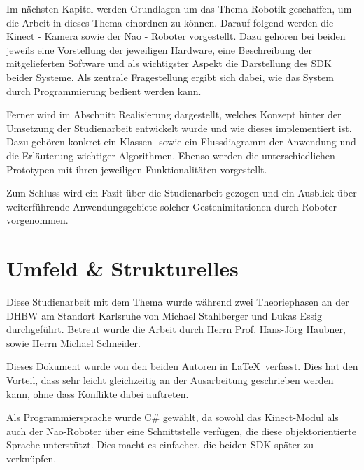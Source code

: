 Im nächsten Kapitel werden Grundlagen um das Thema Robotik geschaffen, um die Arbeit in dieses Thema einordnen zu können. Darauf folgend werden die Kinect - Kamera sowie der Nao - Roboter vorgestellt. Dazu gehören bei beiden jeweils eine Vorstellung der jeweiligen Hardware, eine Beschreibung der mitgelieferten Software und als wichtigster Aspekt die Darstellung des \ac{SDK} beider Systeme. Als zentrale Fragestellung ergibt sich dabei, wie das System durch Programmierung bedient werden kann.

Ferner wird im Abschnitt Realisierung dargestellt, welches Konzept hinter der Umsetzung der Studienarbeit entwickelt wurde und wie dieses implementiert ist. Dazu gehören konkret ein Klassen- sowie ein Flussdiagramm der Anwendung und die Erläuterung wichtiger Algorithmen. Ebenso werden die unterschiedlichen Prototypen mit ihren jeweiligen Funktionalitäten vorgestellt. 

Zum Schluss wird ein Fazit über die Studienarbeit gezogen und ein Ausblick über weiterführende Anwendungsgebiete solcher Gestenimitationen durch Roboter vorgenommen.

\section{Umfeld \& Strukturelles}
Diese Studienarbeit mit dem Thema \textit{\Titel} wurde während zwei Theoriephasen an der \ac{DHBW} am Standort Karlsruhe von Michael Stahlberger und Lukas Essig durchgeführt. Betreut wurde die Arbeit durch Herrn Prof. Hans-Jörg Haubner, sowie Herrn Michael Schneider. 

Dieses Dokument wurde von den beiden Autoren in \LaTeX\ verfasst. Dies hat den Vorteil, dass sehr leicht gleichzeitig an der Ausarbeitung geschrieben werden kann, ohne dass Konflikte dabei auftreten. 

Als Programmiersprache wurde C\# gewählt, da sowohl das Kinect-Modul als auch der Nao-Roboter über eine Schnittstelle verfügen, die diese objektorientierte Sprache unterstützt. Dies macht es einfacher, die beiden \ac{SDK} später zu verknüpfen.


